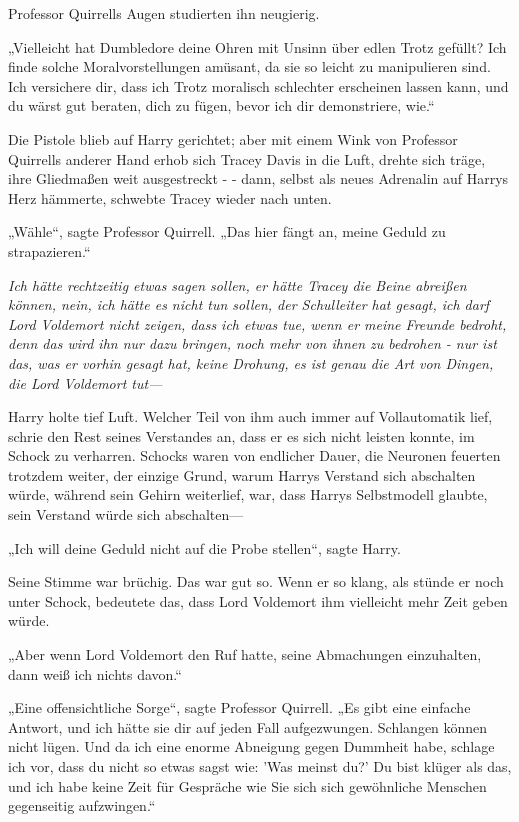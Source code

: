 {Professor Quirrells Augen studierten ihn neugierig.

„Vielleicht hat Dumbledore deine Ohren mit Unsinn über edlen Trotz gefüllt? Ich finde solche Moralvorstellungen amüsant, da sie so leicht zu manipulieren sind. Ich versichere dir, dass ich Trotz moralisch schlechter erscheinen lassen kann, und du wärst gut beraten, dich zu fügen, bevor ich dir demonstriere, wie.“

Die Pistole blieb auf Harry gerichtet; aber mit einem Wink von Professor Quirrells anderer Hand erhob sich Tracey Davis in die Luft, drehte sich träge, ihre Gliedmaßen weit ausgestreckt - - dann, selbst als neues Adrenalin auf Harrys Herz hämmerte, schwebte Tracey wieder nach unten.

„Wähle“, sagte Professor Quirrell. „Das hier fängt an, meine Geduld zu strapazieren.“

\emph{Ich hätte rechtzeitig etwas sagen sollen, er hätte Tracey die Beine abreißen können, nein, ich hätte es nicht tun sollen, der Schulleiter hat gesagt, ich darf Lord Voldemort nicht zeigen, dass ich etwas tue, wenn er meine Freunde bedroht, denn das wird ihn nur dazu bringen, noch mehr von ihnen zu bedrohen - nur ist das, was er vorhin gesagt hat, keine Drohung, es ist genau die Art von Dingen, die Lord Voldemort tut—}

Harry holte tief Luft. Welcher Teil von ihm auch immer auf Vollautomatik lief, schrie den Rest seines Verstandes an, dass er es sich nicht leisten konnte, im Schock zu verharren. Schocks waren von endlicher Dauer, die Neuronen feuerten trotzdem weiter, der einzige Grund, warum Harrys Verstand sich abschalten würde, während sein Gehirn weiterlief, war, dass Harrys Selbstmodell glaubte, sein Verstand würde sich abschalten—

„Ich will deine Geduld nicht auf die Probe stellen“, sagte Harry.

Seine Stimme war brüchig. Das war gut so. Wenn er so klang, als stünde er noch unter Schock, bedeutete das, dass Lord Voldemort ihm vielleicht mehr Zeit geben würde.

„Aber wenn Lord Voldemort den Ruf hatte, seine Abmachungen einzuhalten, dann weiß ich nichts davon.“

„Eine offensichtliche Sorge“, sagte Professor Quirrell. „Es gibt eine einfache Antwort, und ich hätte sie dir auf jeden Fall aufgezwungen. Schlangen können nicht lügen. Und da ich eine enorme Abneigung gegen Dummheit habe, schlage ich vor, dass du nicht so etwas sagst wie: 'Was meinst du?' Du bist klüger als das, und ich habe keine Zeit für Gespräche wie Sie sich sich gewöhnliche Menschen gegenseitig aufzwingen.“

}
